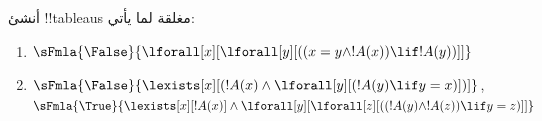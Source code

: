 \documentclass[../../../include/open-logic-section]{subfiles}
\begin{document}
\begin{prob}
أنشئ !!{tableau}s مغلقة لما يأتي:
\begin{enumerate}
\item $\sFmla{\False}{\lforall[x][\lforall[y][((x = y \land !A(x))
      \lif !A(y))]]}$
\item $\sFmla{\False}{\lexists[x][(!A(x) \land
    \lforall[y][(!A(y) \lif y = x)])]}$,\\
  $\sFmla{\True}{\lexists[x][!A(x)] \land
    \lforall[y][\lforall[z][((!A(y) \land !A(z)) \lif y = z)]]}$
\end{enumerate}
\end{prob}
\end{document}
